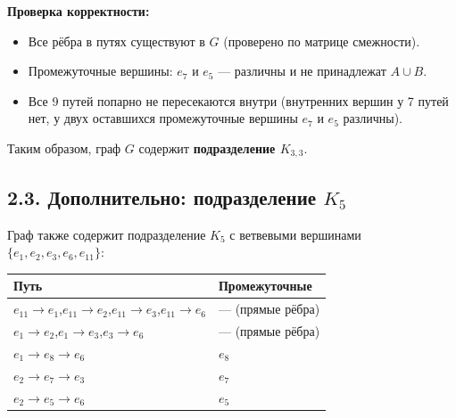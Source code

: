 \documentclass[a4paper,12pt]{article}
\begin{document}
\textbf{Проверка корректности:}
\begin{itemize}
	\item Все рёбра в путях существуют в $G$ (проверено по матрице смежности).
	\item Промежуточные вершины: $e_7$ и $e_5$ --- различны и не принадлежат $A \cup B$.
	\item Все 9 путей попарно не пересекаются внутри (внутренних вершин у 7 путей нет,
	      у двух оставшихся промежуточные вершины $e_7$ и $e_5$ различны).
\end{itemize}

Таким образом, граф $G$ содержит \textbf{подразделение $K_{3,3}$}.

\bigskip
\noindent{}

\subsection*{2.3. Дополнительно: подразделение $K_5$}

Граф также содержит подразделение $K_5$ с ветвевыми вершинами
$\{e_1, e_2, e_3, e_6, e_{11}\}$:

\begin{center}
	\renewcommand{\arraystretch}{1.3}
	\begin{tabular}{|l|l|}
		\hline
		\textbf{Путь}                                                                         & \textbf{Промежуточные} \\
		\hline
		$e_{11} \to e_1$,\quad $e_{11} \to e_2$,\quad $e_{11} \to e_3$,\quad $e_{11} \to e_6$ & --- (прямые рёбра)     \\
		$e_1 \to e_2$,\quad $e_1 \to e_3$,\quad $e_3 \to e_6$                                 & --- (прямые рёбра)     \\
		$e_1 \to e_8 \to e_6$                                                                 & $e_8$                  \\
		$e_2 \to e_7 \to e_3$                                                                 & $e_7$                  \\
		$e_2 \to e_5 \to e_6$                                                                 & $e_5$                  \\
		\hline
	\end{tabular}
\end{center}
\end{document}
